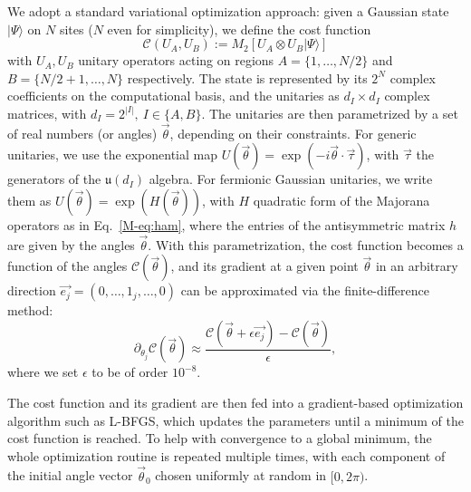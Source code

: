 \documentclass[aps,prl,twocolumn,superscriptaddress,reprint,longbibliography,nofootinbib]{revtex4-2}
\begin{document}
We adopt a standard variational optimization approach: given a Gaussian state $|\Psi\rangle$ on $N$ sites ($N$ even for simplicity), we define the cost function
\begin{equation}
    \mathcal{C}(U_A, U_B) := M_2\left[U_A \otimes U_B |\Psi \rangle \right]
    \label{eq:cost_function}
\end{equation}
with $U_A, U_B$ unitary operators acting on regions $A=\{1, \ldots, {N/2}\}$ and $B=\{{N/2+1}, \ldots, N\}$ respectively. The state is represented by its $2^N$ complex coefficients on the computational basis, and the unitaries as $d_I \times d_I$ complex matrices, with $d_I=2^{|I|}, \ I \in\{A,B\}$. The unitaries are then parametrized by a set of real numbers (or angles) $\vec{\theta}$, depending on their constraints. For generic unitaries, we use the exponential map $U(\vec{\theta})=\exp(-i\vec{\theta} \cdot \vec{\tau})$, with $\vec{\tau}$ the generators of the $\mathfrak{u}(d_{I})$ algebra. For fermionic Gaussian unitaries, we write them as $U(\vec{\theta})=\exp(H(\vec{\theta}))$, with $H$ quadratic form of the Majorana operators as in Eq.~\eqref{M-eq:ham}, where the entries of the antisymmetric matrix $h$ are given by the angles $\vec{\theta}$. With this parametrization, the cost function becomes a function of the angles $\mathcal{C}(\vec{\theta})$, and its gradient at a given point $\vec{\theta}$ in an arbitrary direction $\vec{e_j}=(0,\ldots,1_j,\ldots,0)$ can be approximated via the finite-difference method:
\begin{equation}
    \partial_{\theta_j}\mathcal{C}(\vec{\theta}) \approx \frac{\mathcal{C}(\vec{\theta}+\epsilon\vec{e_j}) - \mathcal{C}(\vec{\theta})}{ \epsilon},
\end{equation} 
where we set $\epsilon$ to be of order $10^{-8}$.

The cost function and its gradient are then fed into a gradient-based optimization algorithm such as L-BFGS, which updates the parameters until a minimum of the cost function is reached. To help with convergence to a global minimum, the whole optimization routine is repeated multiple times, with each component of the initial angle vector $\vec{\theta}_0$  chosen uniformly at random in $[0,2\pi)$.
\end{document}
